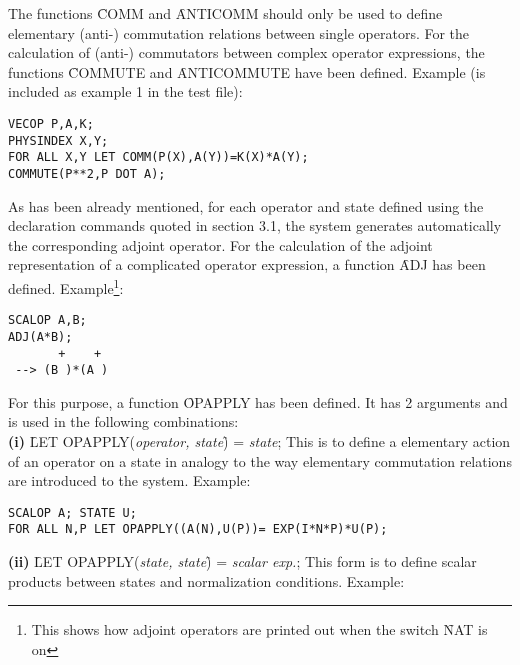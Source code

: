 The functions \f{COMM} and \f{ANTICOMM} should only be used  to
define
elementary (anti-) commutation relations between single operators.
For the calculation of (anti-) commutators between complex
operator
expressions, the functions \f{COMMUTE}  and
\f{ANTICOMMUTE}  have been defined.
Example (is included as example 1 in the test file): \\

\begin{verbatim}
VECOP P,A,K;
PHYSINDEX X,Y;
FOR ALL X,Y LET COMM(P(X),A(Y))=K(X)*A(Y);
COMMUTE(P**2,P DOT A);
\end{verbatim}


As has been already mentioned, for each operator and state defined
using the declaration commands quoted in section 3.1, the system
generates automatically the corresponding adjoint operator. For the
calculation of the adjoint representation of a complicated
operator expression, a function  \f{ADJ}  has been defined.
Example\footnote{This shows how adjoint operators are printed out
when the switch \f{NAT} is on}: \\

\begin{verbatim}
SCALOP A,B;
ADJ(A*B);
       +    +
 --> (B )*(A )
\end{verbatim}


For this purpose, a function \f{OPAPPLY}  has been
defined.
It has 2 arguments and is used in the following combinations: \\

{\bf (i)}  \f{LET OPAPPLY(}{\it operator, state}\f{) =} {\it state};
This is to define a elementary
action of an operator on a state in analogy to the way
elementary commutation relations are introduced to the system.
Example: \\

\begin{verbatim}
SCALOP A; STATE U;
FOR ALL N,P LET OPAPPLY((A(N),U(P))= EXP(I*N*P)*U(P);
\end{verbatim}

{\bf (ii)} \f{LET OPAPPLY(}{\it state, state}\f{) =} {\it scalar exp.};
This form is to define scalar products between states and normalization
conditions.
Example:  \\

